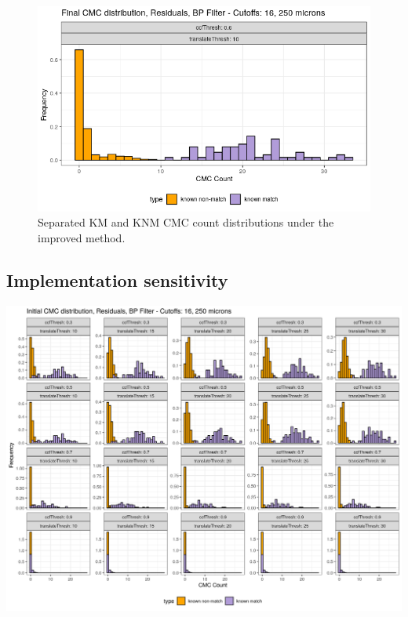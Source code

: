 \begin{figure}[htbp]
  \centering
	\includegraphics[width = .7\textwidth]{./images/finalCMCdistributions.png}
	\caption{Separated KM and KNM CMC count distributions under the improved method.}
 	\label{figure:improvedMethodPerfectIdentification}
\end{figure}

\subsection{Implementation sensitivity}

\begin{widefigure}[htbp]
  \centering
	\includegraphics[width = \linewidth]{./images/initialCMCResidualsBP16_250plot_corr30-90_trans10-30_noAUC.png}
	\caption{KM and KNM CMC count distributions under the initial method for various combinations of $CCF_{\max}$ and translation thresholds.}
 	\label{figure:initialMethodSensitivity}
\end{widefigure}

